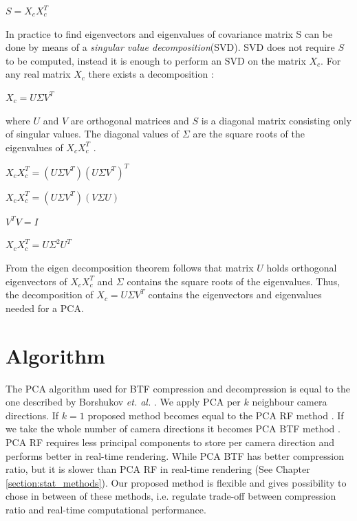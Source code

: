 {\centering$S=X_{c}X_{c}^T$\\}


In practice to find eigenvectors and eigenvalues of covariance matrix S can be done by means of a \emph{singular value decomposition}(SVD).
SVD does not require $S$ to be computed, instead it is enough to perform an SVD on the matrix $X_{c}$.
For any real matrix $X_{c}$ there exists a decomposition \cite{svd}:

{\centering $X_{c}=U\Sigma V^{T}$ \\}

where $U$ and $V$ are orthogonal matrices and $S$ is a diagonal matrix consisting only of singular values.
The diagonal values of $\Sigma$ are the square roots of the eigenvalues of $X_{c}X_{c}^T$ \cite{Lecture12A}.


{\centering $X_{c}X_{c}^T=(U\Sigma V^{T})(U\Sigma V^{T})^T$ \\}

{\centering $X_{c}X_{c}^T=(U\Sigma V^{T})(V\Sigma U)$ \\}

{\centering $V^{T}V=I$ \\}

{\centering $X_{c}X_{c}^T=U\Sigma^2 U^{T}$ \\}

From the eigen decomposition theorem \cite{eigendecompostion} follows that matrix $U$ holds orthogonal eigenvectors of $X_{c}X_{c}^T$
and $\Sigma$ contains the square roots of the eigenvalues.
Thus, the decomposition of $X_{c}=U\Sigma V^{T}$ contains the eigenvectors and eigenvalues needed for a PCA.

\section{Algorithm}
\label{section:algorithm_step}
The PCA algorithm used for BTF compression and decompression is equal to the one described by Borshukov  \emph{et. al.} \cite[Ch.\ 15]{gpu_gems}.
We apply PCA per $k$ neighbour camera directions. 
 If $k=1$ proposed method becomes equal to the PCA RF method \cite{haindl}. 
If we take the whole number of camera directions it becomes PCA BTF method \cite{haindl}.
PCA RF requires less principal components to store per camera direction and performs better in real-time rendering. 
While PCA BTF has better compression ratio, but it is slower than PCA RF in real-time rendering (See Chapter \ref{section:stat_methods}).
Our proposed method is flexible and gives possibility to chose in between of these methods, i.e. regulate trade-off between compression ratio and real-time computational performance.

